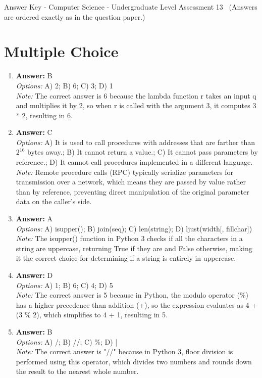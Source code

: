 \documentclass[12pt]{article}
\begin{document}
\begin{center}
Answer Key - Computer Science - Undergraduate Level Assessment 13 \
\small (Answers are ordered exactly as in the question paper.)
\end{center}

\section*{Multiple Choice}
\begin{enumerate}[label=\arabic*.]
\item \textbf{Answer:} B
\\ \textit{Options:} A) 2; B) 6; C) 3; D) 1
\\ \textit{Note:} The correct answer is 6 because the lambda function r takes an input q and multiplies it by 2, so when r is called with the argument 3, it computes 3 * 2, resulting in 6.
\item \textbf{Answer:} C
\\ \textit{Options:} A) It is used to call procedures with addresses that are farther than $2^16$ bytes away.; B) It cannot return a value.; C) It cannot pass parameters by reference.; D) It cannot call procedures implemented in a different language.
\\ \textit{Note:} Remote procedure calls (RPC) typically serialize parameters for transmission over a network, which means they are passed by value rather than by reference, preventing direct manipulation of the original parameter data on the caller's side.
\item \textbf{Answer:} A
\\ \textit{Options:} A) isupper(); B) join(seq); C) len(string); D) ljust(width[, fillchar])
\\ \textit{Note:} The isupper() function in Python 3 checks if all the characters in a string are uppercase, returning True if they are and False otherwise, making it the correct choice for determining if a string is entirely in uppercase.
\item \textbf{Answer:} D
\\ \textit{Options:} A) 1; B) 6; C) 4; D) 5
\\ \textit{Note:} The correct answer is 5 because in Python, the modulo operator (\%) has a higher precedence than addition (+), so the expression evaluates as 4 + (3 \% 2), which simplifies to 4 + 1, resulting in 5.
\item \textbf{Answer:} B
\\ \textit{Options:} A) /; B) //; C) \%; D) |
\\ \textit{Note:} The correct answer is "//" because in Python 3, floor division is performed using this operator, which divides two numbers and rounds down the result to the nearest whole number.
\end{enumerate}
\end{document}
